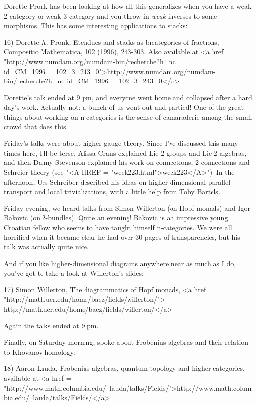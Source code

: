 Dorette Pronk has been looking at how all this generalizes when
you have a weak 2-category or weak 3-category and you throw in 
\emph{weak} inverses to some morphisms.  This has some interesting 
applications to stacks:

16) Dorette A. Pronk, Etendues and stacks as bicategories of 
fractions, Compositio Mathematica, 102 (1996), 243-303.  Also
available at <a href = "http://www.numdam.org/numdam-bin/recherche?h=nc\text{\&} id=CM_1996__102_3_243_0">http://www.numdam.org/numdam-bin/recherche?h=nc\text{\&} id=CM_1996__102_3_243_0</a>

Dorette's talk ended at 9 pm, and everyone went home and collapsed
after a hard day's work.  Actually not: a bunch of us went out and
partied!  One of the great things about working on n-categories is
the sense of camaraderie among the small crowd that does this.

Friday's talks were about higher gauge theory.  Since I've discussed
this many times here, I'll be terse.  Alissa Crans explained Lie 
2-groups and Lie 2-algebras, and then Danny Stevenson explained his 
work on connections, 2-connections and Schreier theory (see 
"<A HREF = "week223.html">week223</A>").  In the afternoon, Urs Schreiber described his ideas 
on higher-dimensional parallel transport and local trivializations,
with a little help from Toby Bartels.

Friday evening, we heard talks from Simon Willerton (on Hopf monads)
and Igor Bakovic (on 2-bundles).  Quite an evening!  Bakovic is an
impressive young Croatian fellow who seems to have taught himself
n-categories.  We were all horrified when it became clear he had over
30 pages of transparencies, but his talk was actually quite nice.  

And if you like higher-dimensional diagrams anywhere near as much 
as I do, you've got to take a look at Willerton's slides:

17) Simon Willerton, 
The diagrammatics of Hopf monads, 
<a href = "http://math.ucr.edu/home/baez/fields/willerton/">
http://math.ucr.edu/home/baez/fields/willerton/</a>

Again the talks ended at 9 pm.

Finally, on Saturday morning, spoke about Frobenius algebras and
their relation to Khovanov homology:

18) Aaron Lauda, Frobenius algebras, quantum topology and higher 
categories, available at 
<a href = "http://www.math.columbia.edu/~lauda/talks/Fields/">http://www.math.columbia.edu/~lauda/talks/Fields/</a>

